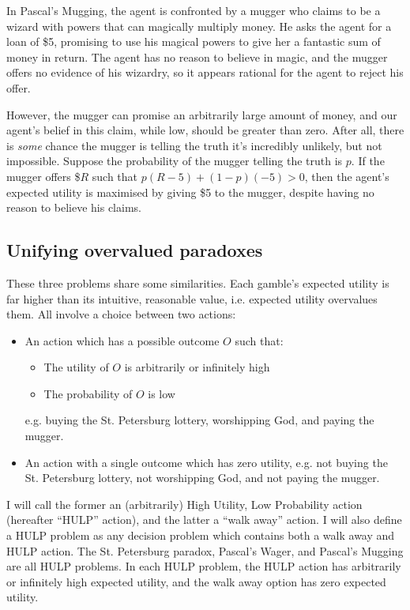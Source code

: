 \documentclass{article}
\begin{document}
In Pascal's Mugging, the agent is confronted by a mugger who claims to be a wizard with powers that can magically multiply money. He asks the agent for a loan of \$5, promising to use his magical powers to give her a fantastic sum of money in return. The agent has no reason to believe in magic, and the mugger offers no evidence of his wizardry, so it appears rational for the agent to reject his offer.

However, the mugger can promise an arbitrarily large amount of money, and our agent's belief in this claim, while low, should be greater than zero. After all, there is \textit{some} chance the mugger is telling the truth \textemdash{} it's incredibly unlikely, but not impossible. Suppose the probability of the mugger telling the truth is \(p\). If the mugger offers \$\(R\) such that \(p(R-5)+(1-p)(-5)>0\), then the agent's expected utility is maximised by giving \$5 to the mugger, despite having no reason to believe his claims.

\subsection{Unifying overvalued paradoxes}
These three problems share some similarities. Each gamble's expected utility is far higher than its intuitive, reasonable value, i.e. expected utility overvalues them. All involve a choice between two actions:

\begin{itemize}
\item An action which has a possible outcome \(O\) such that:
\begin{itemize}
\item The utility of \(O\) is arbitrarily or infinitely high
\item The probability of \(O\) is low
\end{itemize}
e.g. buying the St. Petersburg lottery, worshipping God, and paying the mugger.
\item An action with a single outcome which has zero utility, e.g. not buying the St. Petersburg lottery, not worshipping God, and not paying the mugger.
\end{itemize}

I will call the former an (arbitrarily) High Utility, Low Probability action (hereafter ``HULP'' action), and the latter a ``walk away'' action. I will also define a HULP problem as any decision problem which contains both a walk away and HULP action. The St. Petersburg paradox, Pascal's Wager, and Pascal's Mugging are all HULP problems. In each HULP problem, the HULP action has arbitrarily or infinitely high expected utility, and the walk away option has zero expected utility. 
\end{document}
